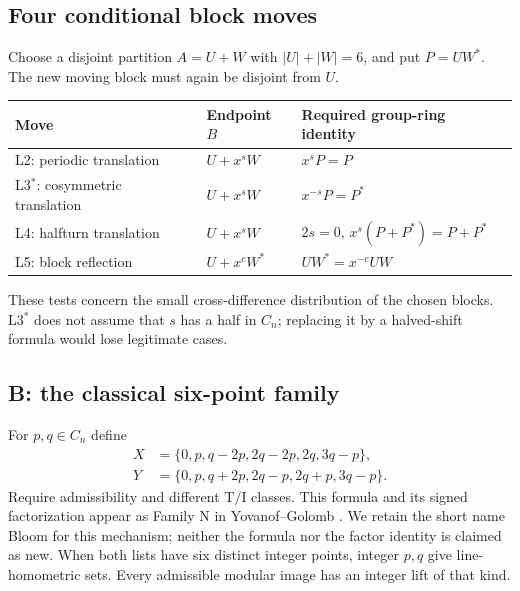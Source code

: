 \documentclass[11pt]{article}
\theoremstyle{remark}
\newcommand{\TI}{\mathrm{T/I}}
\begin{document}
\subsection{Four conditional block moves}
Choose a disjoint partition $A=U+W$ with $|U|+|W|=6$, and put $P=UW^*$.
The new moving block must again be disjoint from $U$.
\begin{center}
\small
\begin{tabular}{lll}
\toprule
Move & Endpoint $B$ & Required group-ring identity\\
\midrule
L2: periodic translation & $U+x^sW$ & $x^sP=P$\\
L3$^*$: cosymmetric translation & $U+x^sW$ & $x^{-s}P=P^*$\\
L4: halfturn translation & $U+x^sW$ & $2s=0$, $x^s(P+P^*)=P+P^*$\\
L5: block reflection & $U+x^cW^*$ & $UW^*=x^{-c}UW$\\
\bottomrule
\end{tabular}
\end{center}
These tests concern the small cross-difference distribution of the
chosen blocks. L3$^*$ does not assume that $s$ has a half in $C_n$;
replacing it by a halved-shift formula would lose legitimate cases.

\subsection{B: the classical six-point family}
For $p,q\in C_n$ define
\begin{align}
X&=\{0,p,q-2p,2q-2p,2q,3q-p\},\label{eq:bloomx}\\
Y&=\{0,p,q+2p,2q-p,2q+p,3q-p\}.\label{eq:bloomy}
\end{align}
Require admissibility and different $\TI$ classes. This formula and its signed factorization appear as Family N in
Yovanof--Golomb \cite[p.~47]{yg}. We retain the short name Bloom for this
mechanism; neither the formula nor the factor identity is claimed as new.
When both lists have six distinct integer points, integer $p,q$ give
line-homometric sets. Every admissible modular
image has an integer lift of that kind.
\end{document}
